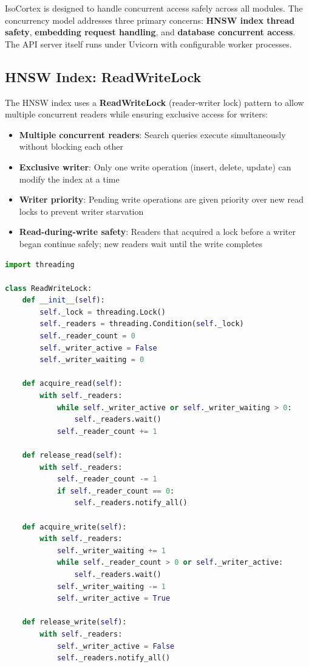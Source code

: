 \documentclass[11pt,a4paper]{article}
\begin{document}
IsoCortex is designed to handle concurrent access safely across all modules. The concurrency model addresses three primary concerns: \textbf{HNSW index thread safety}, \textbf{embedding request handling}, and \textbf{database concurrent access}. The API server itself runs under Uvicorn with configurable worker processes.

\subsection{HNSW Index: ReadWriteLock}

The HNSW index uses a \textbf{ReadWriteLock} (reader-writer lock) pattern to allow multiple concurrent readers while ensuring exclusive access for writers:

\begin{reqbox}
\begin{itemize}
    \item \textbf{Multiple concurrent readers}: Search queries execute simultaneously without blocking each other
    \item \textbf{Exclusive writer}: Only one write operation (insert, delete, update) can modify the index at a time
    \item \textbf{Writer priority}: Pending write operations are given priority over new read locks to prevent writer starvation
    \item \textbf{Read-during-write safety}: Readers that acquired a lock before a writer began continue safely; new readers wait until the write completes
\end{itemize}
\end{reqbox}

\begin{lstlisting}[language=Python,title={ReadWriteLock Implementation Sketch}]
import threading

class ReadWriteLock:
    def __init__(self):
        self._lock = threading.Lock()
        self._readers = threading.Condition(self._lock)
        self._reader_count = 0
        self._writer_active = False
        self._writer_waiting = 0

    def acquire_read(self):
        with self._readers:
            while self._writer_active or self._writer_waiting > 0:
                self._readers.wait()
            self._reader_count += 1

    def release_read(self):
        with self._readers:
            self._reader_count -= 1
            if self._reader_count == 0:
                self._readers.notify_all()

    def acquire_write(self):
        with self._readers:
            self._writer_waiting += 1
            while self._reader_count > 0 or self._writer_active:
                self._readers.wait()
            self._writer_waiting -= 1
            self._writer_active = True

    def release_write(self):
        with self._readers:
            self._writer_active = False
            self._readers.notify_all()
\end{lstlisting}
\end{document}
